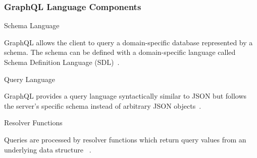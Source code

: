 \begin{frame}\frametitle{GraphQL Language Components}

\begin{block}{Schema Language}

GraphQL allows the client to query a domain-specific database represented by a schema. The schema can be defined with a domain-specific language called Schema Definition Language (SDL)~\cite{migrating-to-gql,gql-on-graph-db}.

\end{block}

\begin{block}{Query Language}

GraphQL provides a query language syntactically similar to JSON but follows the server's specific schema instead of arbitrary JSON objects~\cite{gql-on-graph-db,initial-analysis-of-gql}. 

\end{block}

\begin{block}{Resolver Functions}

Queries are processed by resolver functions which return query values from an underlying data structure  ~\cite{migrating-to-gql,real-time-sys-arc-based-on-gql}.

\end{block}


\end{frame}

\begin{frame}
\end{frame}

\begin{frame}



\end{frame}
